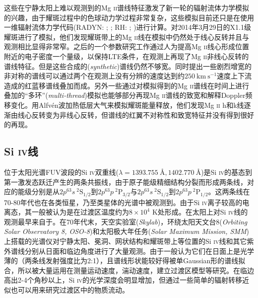 这些在宁静太阳上难以观测到的Mg \textsc{ii}谱线特征激发了新一轮的辐射流体力学模拟的兴趣，由于耀斑过程中的色球动力学过程非常复杂，这些模拟目前还只是在使用一维辐射流体力学代码(RADYN: \cites{Allred2005,Allred2015}; \cites{Carlsson1992,Carlsson1997}; RH: \cites{Uitenbroek2001}; \cites{Pereira2015b})进行计算。\textcites{Rubio2016}对2014年3月29日的X1.1级耀斑进行了模拟，他们发现耀斑带上的Mg \textsc{ii}线在模拟中仍然处于线心反转并且与观测相比显得非常窄。之后的一个参数研究工作通过人为提高Mg \textsc{ii}线心形成位置附近的电子密度一个量级，以保持LTE条件，在观测上再现了Mg \textsc{ii}非线心反转的谱线特征。但是这些合成的(\textit{synthetic})谱线仍然不够宽\parencites{Rubio2017}。同时\textcites{Rubio2017}提出一些剧烈增宽的非对称的谱线可以通过两个在观测上没有分辨的速度达到约$250\ \mathrm{km}\ \mathrm{s^{-1}}$速度上下流造成的红蓝移谱线叠加而成。另外一些通过对模拟得到的Mg \textsc{ii}谱线在时间上进行叠加的“多环”(\textit{multi-thread})模拟也能够部分再现Mg \textsc{ii}谱线的致宽和解释Doppler频移变化\parencites{Reep2019}。\textcites{Kerr2016}用Alfv\'en波加热低层大气来模拟耀斑能量释放，他们发现Mg \textsc{ii} h和k线逐渐由线心反转变为非线心反转，但谱线的红翼不对称性和致宽特征并没有得到很好的再现。


\subsection{Si \textsc{iv}线}
位于太阳光谱FUV波段的Si \textsc{iv}双重线($\lambda = 1393.755~\mbox{\AA}, 1402.770~\mbox{\AA}$)是Si \textsc{iv}的基态到第一激发态跃迁产生的两条共振线，由于原子能级精细结构分裂而形成两条线，对应的能级分别是从$2p^63s\ ^2\mathrm{S}_{1/2}$到$2p^63p\ ^2\mathrm{P}_{3/2}$与$2p^63s\ ^2\mathrm{S}_{1/2}$到$2p^63p\ ^2\mathrm{P}_{1/2}$。这两条线在70-80年代也在各类恒星，乃至类星体的光谱中被观测到\parencites{Stalio1975,Imhoff1980,Saxner1981,Oranje1982}。由于Si \textsc{iv}离子较高的电离态，其一般被认为是在过渡区温度约为$8\times10^4$ K处形成\parencites{Jordan1969,Doschek1997}。在太阳上对Si \textsc{iv}线的观测最早来自于\textcites{Brueckner1972,Brueckner1973}。在70年代末，天空实验室(\textit{Skylab})，环绕太阳天文台8(\textit{Orbiting Solar Observatory 8, OSO-8})和太阳极大年任务(\textit{Solar Maximum Mission, SMM})上搭载的光谱仪对宁静太阳\parencites{Doschek1976,Mariska1978,Shine1976}、冕洞\parencites{Feldman1976,Francis1977}、网状结构\parencites{Feldman1976b}和耀斑带上\parencites{Porter1984}等位置的Si \textsc{iv}线和其它紫外谱线分别从日面和临边角度进行了大量观测。由于一般认为它们在日面上是光学薄的（两条线发射强度比为2:1），且谱线形状能较好得被单Gaussian形的谱线拟合，所以被大量运用在测量运动速度\parencites{Feldman1976,Gebbie1981}，湍动速度\parencites{Feldman1977c}，建立过渡区模型\parencites{Roussel-Dupre1981}等研究。在临边高出2-4个角秒以上，Si \textsc{iv}的光学深度会明显增加，但通过一些简单的辐射转移近似也可以用来研究过渡区中的物质流动\parencites{Roussel-Dupre1979,Doschek1981}。

